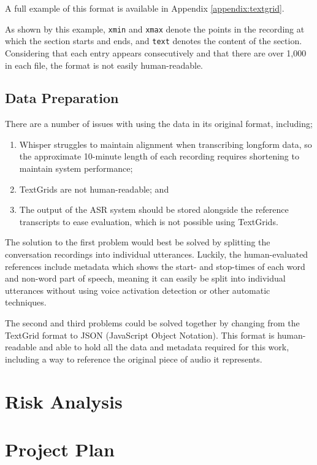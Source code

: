 A full example of this format is available in Appendix \ref{appendix:textgrid}.

As shown by this example, \texttt{xmin} and \texttt{xmax} denote the points in the recording at which the section starts and ends, and \texttt{text} denotes the content of the section.
Considering that each entry appears consecutively and that there are over 1,000 in each file, the format is not easily human-readable.

\subsection{Data Preparation}

There are a number of issues with using the data in its original format, including;

\begin{enumerate}
  \item Whisper struggles to maintain alignment when transcribing longform data\cite{whisper}, so the approximate 10-minute length of each recording requires shortening to maintain system performance;
  \item TextGrids are not human-readable; and
  \item The output of the ASR system should be stored alongside the reference transcripts to ease evaluation, which is not possible using TextGrids.
\end{enumerate}

The solution to the first problem would best be solved by splitting the conversation recordings into individual utterances.
Luckily, the human-evaluated references include metadata which shows the start- and stop-times of each word and non-word part of speech, meaning it can easily be split into individual utterances without using voice activation detection or other automatic techniques.

The second and third problems could be solved together by changing from the TextGrid format to JSON (JavaScript Object Notation).
This format is human-readable\cite{nurseitov2009comparison} and able to hold all the data and metadata required for this work, including a way to reference the original piece of audio it represents.


\section{Risk Analysis}\label{sec:risk-analysis}

\section{Project Plan}\label{sec:project-plan}

